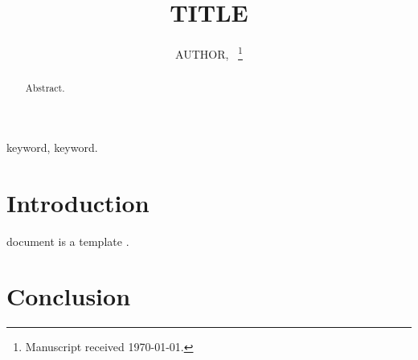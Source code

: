 \documentclass[journal]{IEEEtran}
\begin{document}
\title{{{TITLE}}}
\author{{{AUTHOR}},~%
\thanks{Manuscript received \today.}}
\maketitle
\begin{abstract}
Abstract.
\end{abstract}
\begin{IEEEkeywords}
keyword, keyword.
\end{IEEEkeywords}
\section{Introduction}
 document is a template \cite{example2024}.
\section{Conclusion}


\end{document}
